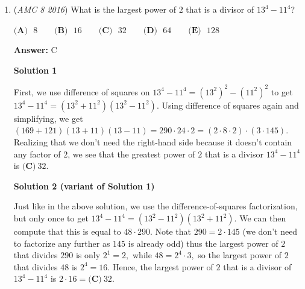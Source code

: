 \begin{enumerate}
 $\textbf{(A)}\mbox{ }525\qquad\textbf{(B)}\mbox{ }560\qquad\textbf{(C)}\mbox{ }595\qquad\textbf{(D)}\mbox{ }665\qquad\textbf{(E)}\mbox{ }735$

 \textbf{Answer: }A



\textbf{Solution}

Since he uses a gallon of gas every $35$ miles, he had used $\frac{350}{35} = 10$ gallons after $350$ miles. Therefore, after the first leg of his trip he had $14 - 10 = 4$ gallons of gas left. Then, he bought $8$ gallons of gas, which brought him up to $12$ gallons of gas in his gas tank. When he arrived, he had $\frac{1}{2} \cdot 14 = 7$ gallons of gas. So he used $5$ gallons of gas on the second leg of his trip. Therefore, the second part of his trip covered $5 \cdot 35 = 175$ miles. Adding this to the $350$ miles, we see that he drove $350 + 175 = \boxed{\textbf{(A)}    \, 525}$ miles.

 


	\item (\textit{AMC 8 2016}) What is the largest power of $2$ that is a divisor of $13^4 - 11^4$?


 $\textbf{(A)}\mbox{ }8\qquad \textbf{(B)}\mbox{ }16\qquad \textbf{(C)}\mbox{ }32\qquad \textbf{(D)}\mbox{ }64\qquad \textbf{(E)}\mbox{ }128$

 \textbf{Answer: }C



\textbf{Solution 1}

First, we use difference of squares on $13^4 - 11^4 = (13^2)^2 - (11^2)^2$ to get $13^4 - 11^4 = (13^2 + 11^2)(13^2 - 11^2)$. Using difference of squares again and simplifying, we get $(169 + 121)(13+11)(13-11) = 290 \cdot 24 \cdot 2 = (2\cdot 8 \cdot 2) \cdot (3 \cdot 145)$. Realizing that we don't need the right-hand side because it doesn't contain any factor of 2, we see that the greatest power of $2$ that is a divisor $13^4 - 11^4$ is $\boxed{\textbf{(C)}\ 32}$.

 



\textbf{Solution 2 (variant of Solution 1)}

Just like in the above solution, we use the difference-of-squares factorization, but only once to get $13^4-11^4=(13^2-11^2)(13^2+11^2).$ We can then compute that this is equal to $48\cdot290.$ Note that $290=2\cdot145$ (we don't need to factorize any further as $145$ is already odd) thus the largest power of $2$ that divides $290$ is only $2^1=2,$ while $48=2^4\cdot3,$ so the largest power of $2$ that divides $48$ is $2^4=16.$ Hence, the largest power of $2$ that is a divisor of $13^4-11^4$ is $2\cdot16=\boxed{\textbf{(C)}~32}.$





\end{enumerate}
